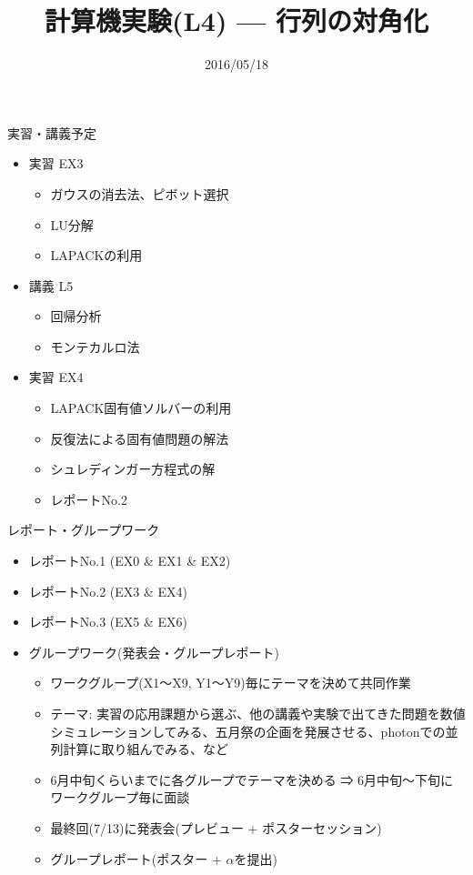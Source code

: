 \documentclass[dvipdfmx]{beamer}
\title{計算機実験(L4) --- 行列の対角化}
\date{2016/05/18}
\begin{document}
\begin{frame}
  \titlepage
  \tableofcontents
\end{frame}






\section{}
\begin{frame}[t,fragile]{実習・講義予定}
  \begin{itemize}
    \setlength{\itemsep}{1em}
  \item 実習 EX3
    \begin{itemize}
    \item ガウスの消去法、ピボット選択
    \item LU分解
    \item LAPACKの利用
    \end{itemize}
  \item 講義 L5
    \begin{itemize}
    \item 回帰分析
    \item モンテカルロ法
    \end{itemize}
  \item 実習 EX4
    \begin{itemize}
    \item LAPACK固有値ソルバーの利用
    \item 反復法による固有値問題の解法
    \item シュレディンガー方程式の解
    \item レポートNo.2
    \end{itemize}
  \end{itemize}
\end{frame}

\begin{frame}[t,fragile]{レポート・グループワーク}
  \begin{itemize}
  \item レポートNo.1 (EX0 \& EX1 \& EX2)
  \item レポートNo.2 (EX3 \& EX4)
  \item レポートNo.3 (EX5 \& EX6)
  \item グループワーク(発表会・グループレポート)
    \begin{itemize}
    \item ワークグループ(X1〜X9, Y1〜Y9)毎にテーマを決めて共同作業
    \item テーマ: 実習の応用課題から選ぶ、他の講義や実験で出てきた問題を数値シミュレーションしてみる、五月祭の企画を発展させる、photonでの並列計算に取り組んでみる、など
    \item 6月中旬くらいまでに各グループでテーマを決める ⇒ 6月中旬〜下旬にワークグループ毎に面談
    \item 最終回(7/13)に発表会(プレビュー + ポスターセッション)
    \item グループレポート(ポスター + $\alpha$を提出)
    \end{itemize}
  \end{itemize}
\end{frame}
\end{document}
